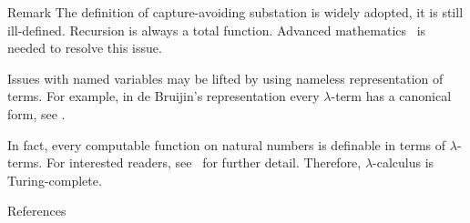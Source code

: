 \begin{frame}{Remark}
 The definition of capture-avoiding substation is widely adopted, it is still
 ill-defined.  Recursion is always a total function. Advanced
 mathematics~\cite{Pitts2013} is needed to resolve this issue.

 Issues with named variables may be lifted by using nameless representation of
 terms. For example, in de Bruijin's representation every $\lambda$-term 
 has a canonical form, see \cite[Chapter 6]{Pierce2002}.

  In fact, every computable function on natural numbers is definable in terms of
  $\lambda$-terms. For interested readers, see~\cite[Chapter 3]{Barendregt1984}
  for further detail. Therefore, $\lambda$-calculus is Turing-complete. 
\end{frame}


\begin{frame}[allowframebreaks]{References}
  
   
\end{frame}


